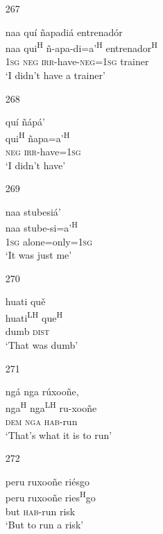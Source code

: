 \begin{itemize}
\item[267]
 
\glll   naa qu\'{i} \~{n}apadi\'{a} entrenad\'{o}r\\
naa qui\textsuperscript{H} \~{n}-apa-di=a'\textsuperscript{H} entrenador\textsuperscript{H}\\
\textsc{1sg} \textsc{neg} \textsc{irr}-have-\textsc{neg}=\textsc{1sg} trainer\\
\glt `I didn't have a trainer'
 


\item[268]
 
\glll   qu\'{i} \~{n}\'{a}p\'{a}'\\
qui\textsuperscript{H} \~{n}apa=a'\textsuperscript{H}\\
\textsc{neg} \textsc{irr}-have=\textsc{1sg}\\
\glt `I didn't have'
 


\item[269]
 
\glll   naa stubesi\'{a}' \\
naa stube-si=a'\textsuperscript{H} \\
\textsc{1sg} alone=only=\textsc{1sg}\\
\glt `It was just me'
 


\item[270]
 
\glll   huati qu\v{e} \\
 huati\textsuperscript{LH} que\textsuperscript{H}\\
dumb \textsc{dist}\\
\glt `That was dumb'
 


\item[271]
 
\glll   ng\'{a} nga r\'{u}xoo\~{n}e, \\
 nga\textsuperscript{H} nga\textsuperscript{LH} ru-xoo\~{n}e\\
 \textsc{dem} \textsc{nga} \textsc{hab}-run\\
\glt `That's what it is to run'
 


\item[272]
 
\glll   peru  ruxoo\~{n}e ri\'{e}sgo\\
peru  ruxoo\~{n}e ries\textsuperscript{H}go\\
but \textsc{hab}-run risk\\
\glt `But to run a risk'
 



\end{itemize}



